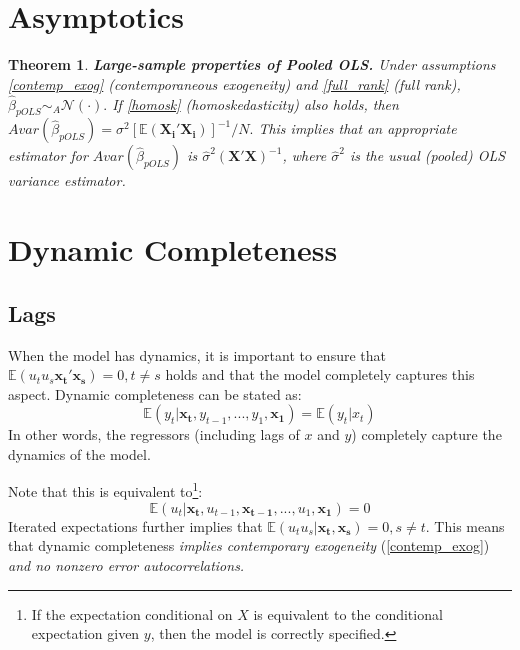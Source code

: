 \documentclass[11pt, a4paper]{report}
\theoremstyle{plain}
\newtheorem{thm}{Theorem}[section]
\theoremstyle{plain}
\theoremstyle{remark}
\begin{document}
\section{Asymptotics}


\begin{thm} \textbf{Large-sample properties of Pooled OLS.} \label{asymp_pols}
    Under assumptions \ref{contemp_exog} (contemporaneous exogeneity) and \ref{full_rank} (full rank), 
    $ \hat{\beta}_{pOLS} \sim_A \mathcal{N}(\cdot). $ If \ref{homosk} (homoskedasticity) also holds, then $Avar(\hat{\beta}_{pOLS}) = \sigma^2[\mathbb{E}(\mathbf{X_i'X_i})]^{-1}/N. $ This implies that an appropriate estimator for $Avar(\hat{\beta}_{pOLS})$ is $\hat{\sigma}^2(\mathbf{X'X})^{-1}$, where $\hat{\sigma}^2$ is the usual (pooled) OLS variance estimator. 

\end{thm}

\section{Dynamic Completeness}

\subsection{Lags}

When the model has dynamics, it is important to ensure that $\mathbb{E}(u_t u_s \mathbf{x_t'x_s}) = 0, t \neq s$ holds and that the model completely captures this aspect. Dynamic completeness can be stated as: 
\begin{equation}
    \mathbb{E}(y_t | \mathbf{x_t}, y_{t-1}, ..., y_1, \mathbf{x_1}) = \mathbb{E}(y_t | x_t)
\end{equation}
In other words, the regressors (including lags of $x$ and $y$) completely capture the dynamics of the model. 

Note that this is equivalent to\footnote{If the expectation conditional on $X$ is equivalent to the conditional expectation given $y$, then the model is correctly specified.}: 
\begin{equation}
    \mathbb{E}(u_t | \mathbf{x_t}, u_{t-1}, \mathbf{x_{t-1}}, ..., u_1, \mathbf{x_1}) = 0 \label{dyn_complete}
\end{equation}
Iterated expectations further implies that $\mathbb{E}(u_t u_s | \mathbf{x_t, x_s}) = 0, s \neq t$. This means that dynamic completeness \textit{implies contemporary exogeneity} (\ref{contemp_exog}) \textit{and no nonzero error autocorrelations.}
\end{document}
